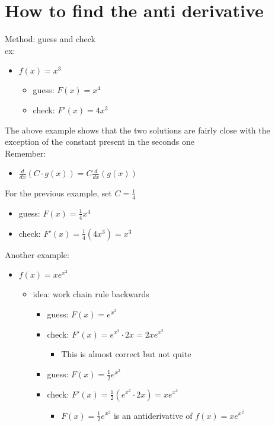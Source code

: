 \documentclass{article}
\begin{document}
\section*{How to find the anti derivative}
Method: guess and check \\
ex:
\begin{itemize}
    \item $f(x) = x^3$
    \begin{itemize}
        \item guess: $F(x) = x^4$
        \item check: $F'(x) = 4x^3$
    \end{itemize}
\end{itemize}
The above example shows that the two solutions are fairly close with the exception of the constant present in the seconds one
\\
Remember:
\begin{itemize}
    \item $\frac{d}{dx}(C \cdot g(x)) = C \frac{d}{dx}(g(x))$
\end{itemize}
For the previous example, set $C = \frac{1}{4}$
\begin{itemize}
    \item guess: $F(x) = \frac{1}{4}x^4$
    \item check: $F'(x) = \frac{1}{4}(4x^3) = x^3$
\end{itemize}
Another example:
\begin{itemize}
    \item $f(x) = xe^{x^2}$
    \begin{itemize}
        \item idea: work chain rule backwards
        \begin{itemize}
            \item guess: $F(x) = e^{x^2}$
            \item check: $F'(x) = e^{x^2} \cdot 2x = 2xe^{x^2}$
            \begin{itemize}
                \item This is almost correct but not quite
            \end{itemize}
            \item guess: $F(x) = \frac{1}{2}e^{x^2}$
            \item check: $F'(x) = \frac{1}{2}(e^{x^2} \cdot 2x) = xe^{x^2}$
            \begin{itemize}
                \item $F(x) = \frac{1}{2}e^{x^2}$ is an antiderivative of $f(x)=xe^{x^2}$
            \end{itemize}
        \end{itemize}
    \end{itemize}
\end{itemize}
\end{document}
